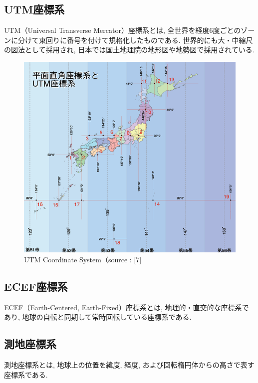 \subsection{UTM座標系}
UTM（Universal Transverse Mercator）座標系\cite{utm}とは, 全世界を経度6度ごとのゾーンに分けて東回りに番号を付けて規格化したものである.
世界的にも大・中縮尺の図法として採用され, 日本では国土地理院の地形図や地勢図で採用されている.

\begin{figure}[H]
  \centering
 \includegraphics[keepaspectratio, scale=0.7]
      {images/UTMCoordinateSystem.png}
 \caption{UTM Coordinate System（source : [7]}
 \label{fig:UTM}
\end{figure}


\subsection{ECEF座標系}
ECEF（Earth-Centered, Earth-Fixed）座標系とは, 地理的・直交的な座標系であり, 地球の自転と同期して常時回転している座標系である.

\subsection{測地座標系}
測地座標系とは, 地球上の位置を緯度, 経度, および回転楕円体からの高さで表す座標系である.

